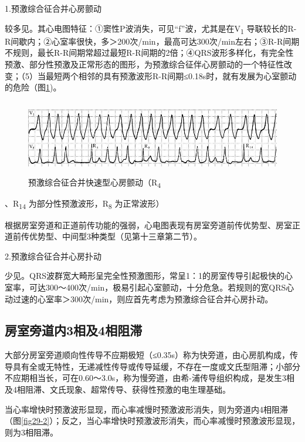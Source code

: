 1.预激综合征合并心房颤动

较多见。其心电图特征：①窦性P波消失，可见“f”波，尤其是在V\textsubscript{1}
导联较长的R-R间歇内；②心室率很快，多＞200次/min，最高可达300次/min左右；③R-R间期不规则，最长R-R间期常超过最短R-R间期的2倍；④QRS波形多样化，有完全性预激、部分性预激及正常形态的图形，为预激综合征伴心房颤动的一个特征性改变；（5）当最短两个相邻的具有预激波形R-R间期≤0.18s时，就有发展为心室颤动的危险（图\ref{fig29-7})。

\begin{figure}[!htbp]
 \centering
 \includegraphics[width=5.61458in,height=1.29167in]{./images/Image00491.jpg}
 \captionsetup{justification=centering}
 \caption{预激综合征合并快速型心房颤动（R\textsubscript{4}}
 \label{fig29-7}
  \end{figure} 
、R\textsubscript{14} 为部分性预激波形，R\textsubscript{8} 为正常波形）

根据房室旁道和正道前传功能的强弱，心电图表现有房室旁道前传优势型、房室正道前传优势型、中间型3种类型（见第十三章第二节）。

2.预激综合征合并心房扑动

少见。QRS波群宽大畸形呈完全性预激图形，常呈1：1的房室传导引起极快的心室率，可达300～400次/min，极易引起心室颤动，十分危急。若规则的宽QRS心动过速的心室率＞300次/min，则应首先考虑为预激综合征合并心房扑动。

\protect\hypertarget{text00036.htmlux5cux23subid425}{}{}

\subsection{房室旁道内3相及4相阻滞}

大部分房室旁道顺向性传导不应期极短（≤0.35s）称为快旁道，由心房肌构成，传导具有全或无特性，无递减性传导或传导延缓，不存在一度或文氏型阻滞；小部分不应期相当长，可在0.60～3.0s，称为慢旁道，由希-浦传导组织构成，是发生3相及4相阻滞、文氏现象、超常传导、获得性预激的电生理基础。

当心率增快时预激波形显现，而心率减慢时预激波形消失，则为旁道内4相阻滞（图\ref{fig29-2}）；反之，当心率增快时预激波形消失，而心率减慢时预激波形显现，则为3相阻滞。


